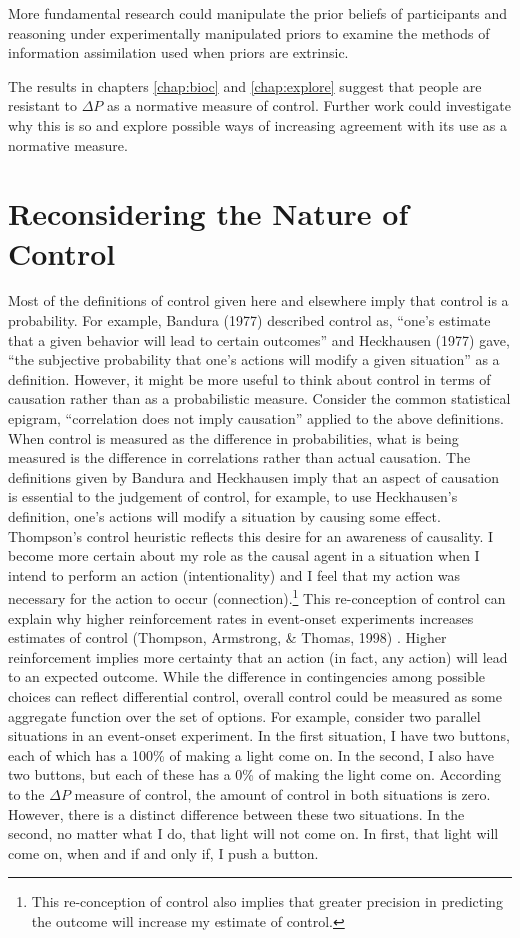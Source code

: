\documentclass[USenglish,letterpaper,12pt,extrafontsizes,oneside,onecolumn,final]{memoir}
\newcommand{\deltap}{$\Delta P$}
\begin{document}
More fundamental research could manipulate the prior beliefs of participants and reasoning under experimentally manipulated priors to examine the methods of information assimilation used when priors are extrinsic.  

The results in chapters \ref{chap:bioc} and \ref{chap:explore} suggest that people are resistant to \deltap \xspace as a normative measure of control.  Further work could investigate why this is so and explore possible ways of increasing agreement with its use as a normative measure.  


\section{Reconsidering the Nature of Control}

Most of the definitions of control given here and elsewhere imply that control is a probability.  For example, Bandura (1977) described control as, ``one's estimate that a given behavior will lead to certain outcomes'' and Heckhausen (1977) gave, ``the subjective probability that one's actions will modify a given situation'' as a definition.  However, it might be more useful to think about control in terms of causation rather than as a probabilistic measure.  Consider the common statistical epigram, ``correlation does not imply causation'' applied to the above definitions.  When control is measured as the difference in probabilities, what is being measured is the difference in correlations rather than actual causation. The definitions given by Bandura and Heckhausen imply that an aspect of causation is essential to the judgement of control, for example, to use Heckhausen's definition, one's actions will modify a situation by causing some effect. Thompson's control heuristic reflects this desire for an awareness of causality.  I become more certain about my role as the causal agent in a situation when I intend to perform an action (intentionality) and I feel that my action was necessary for the action to occur (connection).\footnote{This re-conception of control also implies that greater precision in predicting the outcome will increase my estimate of control.} This re-conception of control can explain why higher reinforcement rates in event-onset experiments increases estimates of control (Thompson, Armstrong, \& Thomas, 1998) .  Higher reinforcement implies more certainty that an action (in fact, any action) will lead to an expected outcome.  While the difference in contingencies among possible choices can reflect differential control, overall control could be measured as some aggregate function over the set of options.  For example, consider two parallel situations in an event-onset experiment.  In the first situation, I have two buttons, each of which has a 100\% of making a light come on.  In the second, I also have two buttons, but each of these has a 0\% of making the light come on.  According to the \deltap \xspace measure of control, the amount of control in both situations is zero.  However, there is a distinct difference between these two situations.  In the second, no matter what I do, that light will not come on.  In first, that light will come on, when and if and only if, I push a button. 
\end{document}
